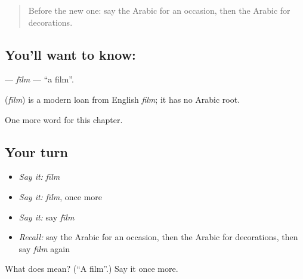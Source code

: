 \label{lesson:AR-C184-film}



\begin{quote}
Before the new one: say the Arabic for an occasion, then the Arabic for decorations.
\end{quote}

\subsection*{You'll want to know: }
\textbf{} — \emph{fīlm} — \textquotedblleft{}a film\textquotedblright{}.

\begin{cousinweb}
\textbf{} (\emph{fīlm}) is a modern loan from English \emph{film}; it has no Arabic root.
\end{cousinweb}

\begin{grammarlens}[title={What you've built}]
One more word for this chapter.
\end{grammarlens}

\subsection*{Your turn}
\begin{itemize}
\raggedright
  \item \emph{Say it:} \emph{fīlm}
  \item \emph{Say it:} \emph{fīlm}, once more
  \item \emph{Say it:} say \emph{fīlm}
  \item \emph{Recall:} say the Arabic for an occasion, then the Arabic for decorations, then say \emph{fīlm} again
\end{itemize}

\begin{tcolorbox}[breakable,colback=teal!4,colframe=teal!35!black,title={Before you move on}]
What does  mean? (\textquotedblleft{}A film\textquotedblright{}.) Say it once more.
\end{tcolorbox}
